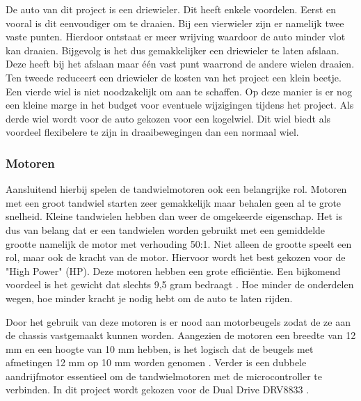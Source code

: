 \documentclass[a4paper,twoside,kulak]{kulakreport} %
\begin{document}
De auto van dit project is een driewieler. Dit heeft enkele voordelen. Eerst en vooral is dit eenvoudiger om te draaien. Bij een vierwieler zijn er namelijk twee vaste punten. Hierdoor ontstaat er meer wrijving waardoor de auto minder vlot kan draaien. Bijgevolg is het dus gemakkelijker een driewieler te laten afslaan. Deze heeft bij het afslaan maar één vast punt waarrond de andere wielen draaien.
Ten tweede reduceert een driewieler de kosten van het project een klein beetje. Een vierde wiel is niet noodzakelijk om aan te schaffen. Op deze manier is er nog een kleine marge in het budget voor eventuele wijzigingen tijdens het project. Als derde wiel wordt voor de auto gekozen voor een kogelwiel. Dit wiel biedt als voordeel flexibelere te zijn in draaibewegingen dan een normaal wiel. 
\label{Wielen}


\subsubsection{Motoren}
Aansluitend hierbij spelen de tandwielmotoren ook een belangrijke rol. Motoren met een groot tandwiel starten zeer gemakkelijk maar behalen geen al te grote snelheid. Kleine tandwielen hebben dan weer de omgekeerde eigenschap. Het is dus van belang dat er een tandwielen worden gebruikt met een gemiddelde grootte namelijk de motor met verhouding 50:1. Niet alleen de grootte speelt een rol, maar ook de kracht van de motor. Hiervoor wordt het best gekozen voor de "High Power" (HP). Deze motoren hebben een grote efficiëntie.%
Een bijkomend voordeel is het gewicht dat slechts 9,5 gram bedraagt \cite{MicroMetalGearMotor50:1HP}. %
Hoe minder de onderdelen wegen, hoe minder kracht je nodig hebt om de auto te laten rijden. 

Door het gebruik van deze motoren is er nood aan motorbeugels zodat de ze aan de chassis  vastgemaakt kunnen worden. Aangezien de motoren een breedte van 12 mm en een hoogte van 10 mm hebben, is het logisch dat de beugels met afmetingen 12 mm op 10 mm worden genomen \cite{MicroMetalGearMotorBeugel}.
Verder is een dubbele aandrijfmotor essentieel om de tandwielmotoren met de microcontroller te verbinden. In dit project wordt gekozen voor de Dual Drive DRV8833 \cite{DualDriveDRV8833}. 
\label{Motoren}
\end{document}
